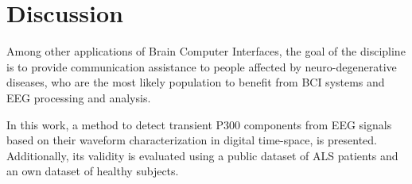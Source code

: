 \documentclass[utf8]{frontiersSCNS} %
\begin{document}
\section{Discussion}
\label{discussion}





Among other applications of Brain Computer Interfaces, the goal of the discipline is to provide communication assistance to people affected by neuro-degenerative diseases, who are the most likely population to benefit from BCI systems and EEG processing and analysis.

In this work, a method to detect transient P300 components from EEG signals based on their waveform characterization in digital time-space, is presented.  Additionally, its validity is evaluated using a public dataset of ALS patients and an own dataset of healthy subjects. 

\end{document}
